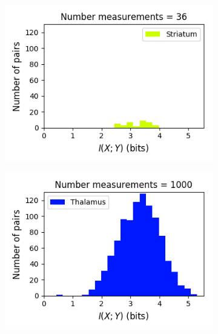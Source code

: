 \documentclass[a4paper,12pt]{article}
\theoremstyle{definition}
\begin{document}
\begin{figure}[p]
\begin{subfigure}{0.5\textwidth}
    \includegraphics[width=\textwidth]{figures/strong_striatum_14_1p0_information_histogram.png}
  \end{subfigure}
  \begin{subfigure}{0.5\textwidth}
    \centering
    \includegraphics[width=\textwidth]{figures/strong_thalamus_15_1p0_information_histogram.png}
  \end{subfigure}
  \begin{subfigure}{0.5\textwidth}
    \centering

\end{subfigure}
\end{figure}
\end{document}
